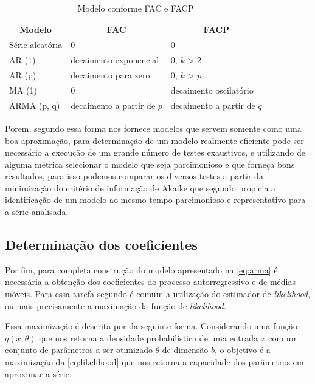 \documentclass[
    12pt,
    oneside,
    a4paper,
    english,
    brazil
]{abntex2}
\begin{document}
\begin{table}[ht]
    \centering
    \caption{Modelo conforme FAC e FACP}\label{tab:facpacf}
    \begin{tabular}{l l l}
        \multicolumn{1}{c}{Modelo} & \multicolumn{1}{c}{FAC} & \multicolumn{1}{c}{FACP} \\
        \toprule
        Série aleatória  & 0                          & 0                      \\
        AR (1)           & decaimento exponencial     & 0, $k$ > 2             \\
        AR (p)           & decaimento para zero       & 0, $k$ > $p$           \\
        MA (1)           & 0                          & decaimento oscilatório \\
        ARMA (p, q)      & decaimento a partir de $p$ & decaimento a partir de $q$
    \end{tabular}
\end{table}

Porem, segundo   essa  forma nos  fornece modelos  que servem
somente  como uma  boa aproximação,  para determinação  de um  modelo realmente
eficiente  pode  ser necessário  a  execução  de  um  grande número  de  testes
exaustivos,  e  utilizando de  alguma  métrica  selecionar  o modelo  que  seja
parcimonioso  e que  forneça  bons  resultados, para  isso  podemos comparar  os
diversos testes a partir da minimização do critério de informação de Akaike que
segundo   propicia  a identificação  de um  modelo ao  mesmo
tempo parcimonioso e representativo para a série analisada.

\subsection{Determinação dos coeficientes}

Por fim, para completa construção  do modelo apresentado na \autoref{eq:arma} é
necessária a obtenção dos coeficientes  do processo autorregressivo e de médias
móveis. Para  essa tarefa  segundo  é  comum a  utilização do
estimador de \textit{likelihood}, ou mais precisamente a maximação da função de
\textit{likelihood}.

Essa  maximização   é  descrita   por     da  seguinte
forma.  Considerando  uma função  $q(x;\theta)$  que  nos retorna  a  densidade
probabilística de uma entrada $x$ com um conjunto de parâmetros a ser otimizado
$\theta$ de dimensão $b$, o objetivo é a maximização da \autoref{eq:likelihood}
que nos retorna a capacidade dos parâmetros em aproximar a série.
\end{document}
